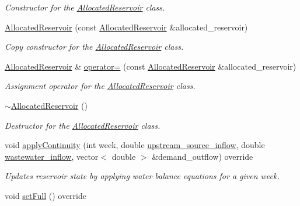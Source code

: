 \begin{DoxyCompactItemize}
\begin{DoxyCompactList}\small\item\em Constructor for the \mbox{\hyperlink{classAllocatedReservoir}{Allocated\+Reservoir}} class. \end{DoxyCompactList}\item 
\mbox{\hyperlink{classAllocatedReservoir_a59098eb446ada7a23e914543f3c419c0}{Allocated\+Reservoir}} (const \mbox{\hyperlink{classAllocatedReservoir}{Allocated\+Reservoir}} \&allocated\+\_\+reservoir)
\begin{DoxyCompactList}\small\item\em Copy constructor for the \mbox{\hyperlink{classAllocatedReservoir}{Allocated\+Reservoir}} class. \end{DoxyCompactList}\item 
\mbox{\hyperlink{classAllocatedReservoir}{Allocated\+Reservoir}} \& \mbox{\hyperlink{classAllocatedReservoir_a31c1733dbf7385599f1b9866df353b4c}{operator=}} (const \mbox{\hyperlink{classAllocatedReservoir}{Allocated\+Reservoir}} \&allocated\+\_\+reservoir)
\begin{DoxyCompactList}\small\item\em Assignment operator for the \mbox{\hyperlink{classAllocatedReservoir}{Allocated\+Reservoir}} class. \end{DoxyCompactList}\item 
\mbox{\hyperlink{classAllocatedReservoir_a3fc9aaca619a97d338449384e579900c}{$\sim$\+Allocated\+Reservoir}} ()
\begin{DoxyCompactList}\small\item\em Destructor for the \mbox{\hyperlink{classAllocatedReservoir}{Allocated\+Reservoir}} class. \end{DoxyCompactList}\item 
void \mbox{\hyperlink{classAllocatedReservoir_aa5a3683ac3a1e7a778627332c6a7fff7}{apply\+Continuity}} (int week, double \mbox{\hyperlink{classWaterSource_a7a69b2e9b6030f1035e6cf44d2918ee5}{upstream\+\_\+source\+\_\+inflow}}, double \mbox{\hyperlink{classWaterSource_aeb5a2d2d83383a70ca20f3e94635a9c7}{wastewater\+\_\+inflow}}, vector$<$ double $>$ \&demand\+\_\+outflow) override
\begin{DoxyCompactList}\small\item\em Updates reservoir state by applying water balance equations for a given week. \end{DoxyCompactList}\item 
void \mbox{\hyperlink{classAllocatedReservoir_aea294cbca1e1630a1307072632d14b05}{set\+Full}} () override

\end{DoxyCompactItemize}
